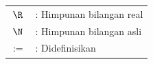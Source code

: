 \renewcommand{\arraystretch}{1.4}
\begin{longtable}{c p{14cm}}
  $\R$   & : Himpunan bilangan real   \\
  $\N$   & : Himpunan bilangan asli   \\
  $:=$   & : Didefinisikan            \\
\end{longtable}
